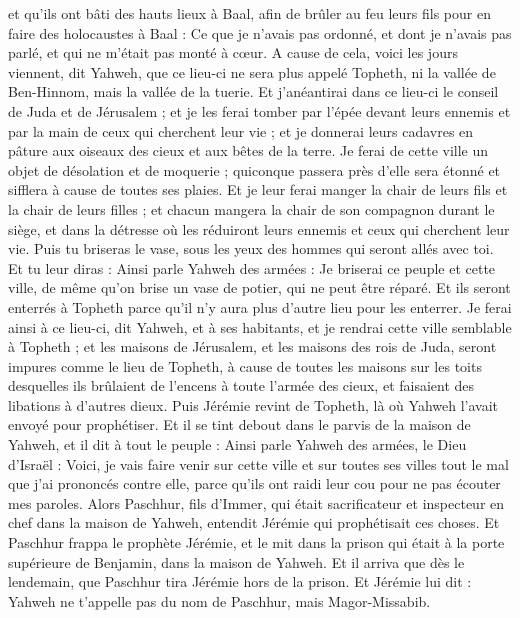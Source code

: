 \begin{multicols}{2}
et qu'ils ont bâti des hauts lieux à Baal, afin de brûler au feu leurs fils pour en faire des holocaustes à Baal : Ce que je n'avais pas ordonné, et dont je n'avais pas parlé, et qui ne m'était pas monté à cœur.
A cause de cela, voici les jours viennent, dit Yahweh, que ce lieu-ci ne sera plus appelé Topheth, ni la vallée de Ben-Hinnom, mais la vallée de la tuerie.
Et j'anéantirai dans ce lieu-ci le conseil de Juda et de Jérusalem ; et je les ferai tomber par l'épée devant leurs ennemis et par la main de ceux qui cherchent leur vie ; et je donnerai leurs cadavres en pâture aux oiseaux des cieux et aux bêtes de la terre.
Je ferai de cette ville un objet de désolation et de moquerie ; quiconque passera près d'elle sera étonné et sifflera à cause de toutes ses plaies.
Et je leur ferai manger la chair de leurs fils et la chair de leurs filles ; et chacun mangera la chair de son compagnon durant le siège, et dans la détresse où les réduiront leurs ennemis et ceux qui cherchent leur vie.
Puis tu briseras le vase, sous les yeux des hommes qui seront allés avec toi.
Et tu leur diras : Ainsi parle Yahweh des armées : Je briserai ce peuple et cette ville, de même qu'on brise un vase de potier, qui ne peut être réparé. Et ils seront enterrés à Topheth parce qu'il n'y aura plus d'autre lieu pour les enterrer.
Je ferai ainsi à ce lieu-ci, dit Yahweh, et à ses habitants, et je rendrai cette ville semblable à Topheth ;
et les maisons de Jérusalem, et les maisons des rois de Juda, seront impures comme le lieu de Topheth, à cause de toutes les maisons sur les toits desquelles ils brûlaient de l'encens à toute l'armée des cieux, et faisaient des libations à d'autres dieux.
Puis Jérémie revint de Topheth, là où Yahweh l'avait envoyé pour prophétiser. Et il se tint debout dans le parvis de la maison de Yahweh, et il dit à tout le peuple :
Ainsi parle Yahweh des armées, le Dieu d'Israël : Voici, je vais faire venir sur cette ville et sur toutes ses villes tout le mal que j'ai prononcés contre elle, parce qu'ils ont raidi leur cou pour ne pas écouter mes paroles.
\VerseOne{}Alors Paschhur, fils d'Immer, qui était sacrificateur et inspecteur en chef dans la maison de Yahweh, entendit Jérémie qui prophétisait ces choses.
Et Paschhur frappa le prophète Jérémie, et le mit dans la prison qui était à la porte supérieure de Benjamin, dans la maison de Yahweh.
Et il arriva que dès le lendemain, que Paschhur tira Jérémie hors de la prison. Et Jérémie lui dit : Yahweh ne t'appelle pas du nom de Paschhur, mais Magor-Missabib.

\end{multicols}
